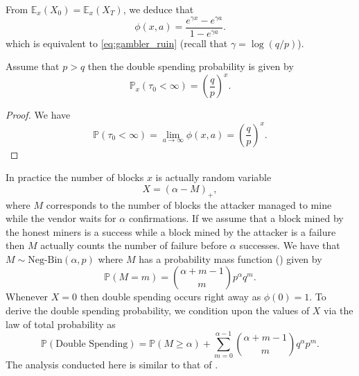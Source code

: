 From $\mathbb{E}_x(X_0) =\mathbb{E}_x(X_T)$, we deduce that 
$$
\phi(x,a) = \frac{e^{\gamma x} - e^{\gamma a}}{1- e^{\gamma a}}.
$$
which is equivalent to \eqref{eq:gambler_ruin} (recall that $\gamma =\log(q/p)$). 
\begin{coro}
Assume that $p>q$ then the double spending probability is given by 
$$
\mathbb{P}_x(\tau_0 <\infty) =\left(\frac{q}{p}\right)^x.
$$
\end{coro}
\begin{proof}
We have
$$
\mathbb{P}(\tau_0 <\infty) = \underset{a\rightarrow \infty}{\lim}\phi(x,a) = \left(\frac{q}{p}\right)^x.
$$
\end{proof}

In practice the number of blocks $x$ is actually random variable 
$$
X = (\alpha -M)_+,
$$ 
where $M$ corresponds to the number of blocks the attacker managed to mine while the vendor waits for $\alpha$ confirmations. If we assume that a block mined by the honest miners is a success while a block mined by the attacker is a failure then $M$ actually counts the number of failure before $\alpha$ successes. We have that $M\sim \text{Neg-Bin}(\alpha, p)$ where $M$ has a probability mass function (\pmf) given by 
$$
\mathbb{P}(M = m) = \binom{\alpha+m-1}{m}p^\alpha q^m.
$$
Whenever $X = 0$ then double spending occurs right away as $\phi(0) =1$. To derive the double spending probability, we condition upon the values of $X$ via the law of total probability as
$$
\mathbb{P}( \text{Double Spending}) = \mathbb{P}(M\geq \alpha)+\sum_{m = 0}^{\alpha-1}\binom{\alpha+m-1}{m}q^\alpha p^m.
$$
The analysis conducted here is similar to that of \citet{rosenfeld2014analysis}.

